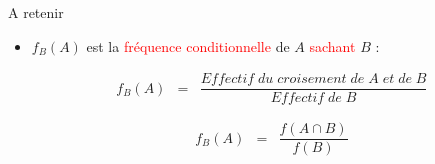 \documentclass[xcolor={dvipsnames}]{beamer}
\begin{document}
\begin{frame}{A retenir}

\begin{itemize}	
	
	\item $f_B(A)$ est la \textcolor{red}{fréquence conditionnelle} de $A$ \textcolor{red}{sachant} $B$ :
	
	\begin{eqnarray*}
		f_B(A) &=& \dfrac{Effectif\; du\; croisement \; de\;A\; et\; de\; B }{Effectif\; de\; B}
	\end{eqnarray*}
	
	\begin{eqnarray*}
		f_B(A) &=& \dfrac{f(A \cap B)}{f(B)}
	\end{eqnarray*}
	
\end{itemize}
\end{frame}
%
%			
%			
%			
%	

	






%
%
%	
\end{document}
